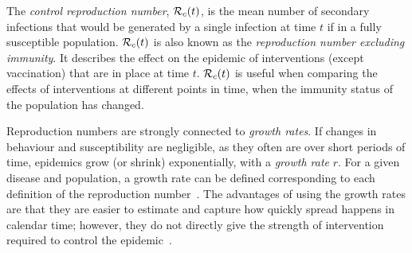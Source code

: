 \documentclass[thesis.tex]{subfiles}
\begin{document}
The \emph{control reproduction number}, $\mathcal{R}_{c}(t)$, is the mean number of secondary infections that would be generated by a single infection at time $t$ if in a fully susceptible population.
$\mathcal{R}_{c}(t)$ is also known as the \emph{reproduction number excluding immunity}.
It describes the effect on the epidemic of interventions (except vaccination) that are in place at time $t$.
$\mathcal{R}_{c}(t)$ is useful when comparing the effects of interventions at different points in time, when the immunity status of the population has changed.



Reproduction numbers are strongly connected to \emph{growth rates}.
If changes in behaviour and susceptibility are negligible, as they often are over short periods of time, epidemics grow (or shrink) exponentially, with a \emph{growth rate} $r$.
For a given disease and population, a growth rate can be defined corresponding to each definition of the reproduction number~\autocite{pellisEstimation,paragGrowthRates,wallingaGI}.
The advantages of using the growth rates are that they are easier to estimate and capture how quickly spread happens in calendar time; however, they do not directly give the strength of intervention required to control the epidemic~\autocite{royalSocietyRnumber}.
\end{document}
